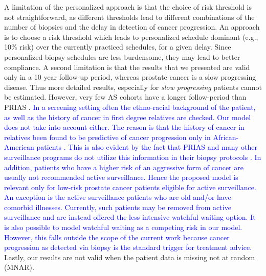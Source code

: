 A limitation of the personalized approach is that the choice of risk threshold is not straightforward, as different thresholds lead to different combinations of the number of biopsies and the delay in detection of cancer progression. An approach is to choose a risk threshold which leads to personalized schedule dominant (e.g., 10\% risk) over the currently practiced schedules, for a given delay. Since personalized biopsy schedules are less burdensome, they may lead to better compliance. A second limitation is that the results that we presented are valid only in a 10 year follow-up period, whereas prostate cancer is a slow progressing disease. Thus more detailed results, especially for \textit{slow progressing} patients cannot be estimated. However, very few AS cohorts have a longer follow-period than PRIAS \cite{bruinsma2016active}. \textcolor{blue}{In a screening setting often the ethno-racial background of the patient, as well as the history of cancer in first degree relatives are checked. Our model does not take into account either. The reason is that the history of cancer in relatives been found to be predictive of cancer progression only in African-American patients \cite{goh2013clinical,telang2017prostate}. This is also evident by the fact that PRIAS and many other surveillance programs do not utilize this information in their biopsy protocols \cite{bokhorst2016decade,nieboer2018active}. In addition, patients who have a higher risk of an aggressive form of cancer are usually not recommended active surveillance. Hence the proposed model is relevant only for low-risk prostate cancer patients eligible for active surveillance. An exception is the active surveillance patients who are old and/or have comorbid illnesses. Currently, such patients may be removed from active surveillance and are instead offered the less intensive watchful waiting \cite{bokhorst2016decade} option. It is also possible to model watchful waiting as a competing risk in our model. However, this falls outside the scope of the current work because cancer progression as detected via biopsy is the standard trigger for treatment advice.} Lastly, our results are not valid when the patient data is missing not at random (MNAR).

